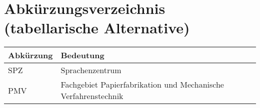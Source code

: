 \chapter*{Abkürzungsverzeichnis (tabellarische Alternative)}
\begin{spacing}{1.5}
\setlength\LTleft{15pt}
\setlength\LTright{\fill}
\begin{longtable}{ll}
	\textbf{Abkürzung} & \textbf{Bedeutung}\\\midrule\endhead
	SPZ & Sprachenzentrum\\
	PMV & Fachgebiet Papierfabrikation und Mechanische Verfahrenstechnik\\
\end{longtable}
\end{spacing}